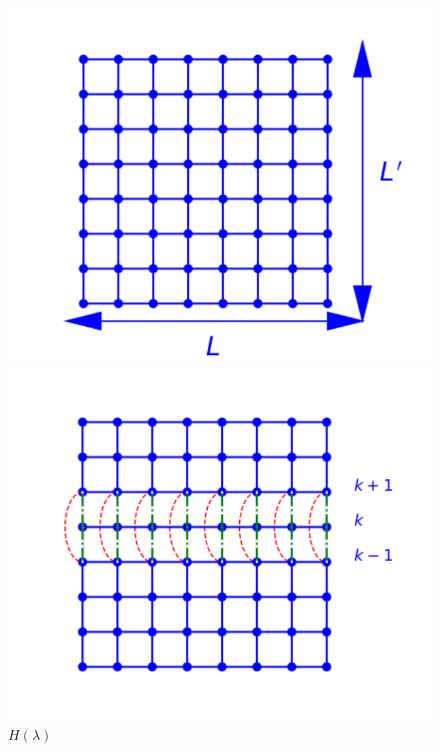 \begin{figure}
\begin{minipage}[t]{0.32\linewidth}
\includegraphics[width=\linewidth]{numerical/cross-h0.pdf}
\caption*{$H_0$}
\end{minipage}
\begin{minipage}[t]{0.32\linewidth}
\includegraphics[width=\linewidth]{numerical/cross-hlambda.pdf}
\caption*{$H(\lambda)$} 
\end{minipage}
\centering
\begin{minipage}[t]{0.32\linewidth}

\end{minipage}
\end{figure}
